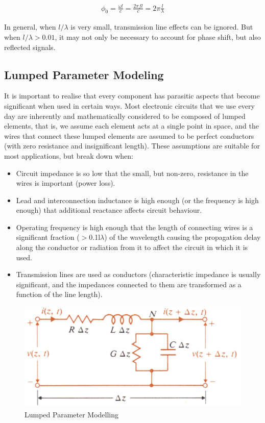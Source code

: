 \documentclass{book}
\begin{document}
\begin{align*}
	\phi_0 = \frac{\omega l}{c} = \frac{2\pi fl}{c} = 2\pi \frac{l}{\lambda}
\end{align*}

In general, when $l/\lambda$ is very small, transmission line effects can be ignored. But when $l/\lambda>0.01$, it may not only be necessary to account for phase shift, but also reflected signals.

\subsection{Lumped Parameter Modeling}

It is important to realise that every component has parasitic aspects that become significant when used in certain ways.  Most electronic circuits that we use every day are inherently and mathematically considered to be composed of lumped elements, that is, we assume each element acts at a single point in space, and the wires that connect these lumped elements are assumed to be perfect conductors (with zero resistance and insignificant length). These assumptions are suitable for most applications, but break down when:

\begin{itemize}
	\item Circuit impedance is so low that the small, but non-zero, resistance in the wires is important (power loss).  
	\item Lead and interconnection inductance is high enough (or the frequency is high enough) that additional reactance affects circuit behaviour.
	\item Operating frequency is high enough that the length of connecting wires is a significant fraction ($>$0.1l$\lambda$) of the wavelength causing the propagation delay along the conductor or radiation from it to affect the circuit in which it is used.
	\item Transmission lines are used as conductors (characteristic impedance is usually significant, and the impedances connected to them are transformed as a function of the line length).
\end{itemize}

  
\begin{figure}[h]
	\centering
	\includegraphics[width=0.4\linewidth]{Screenshots/lumped_parameter}
	\caption{Lumped Parameter Modelling}
	\label{fig:lumpedparameter}
\end{figure}
\end{document}
